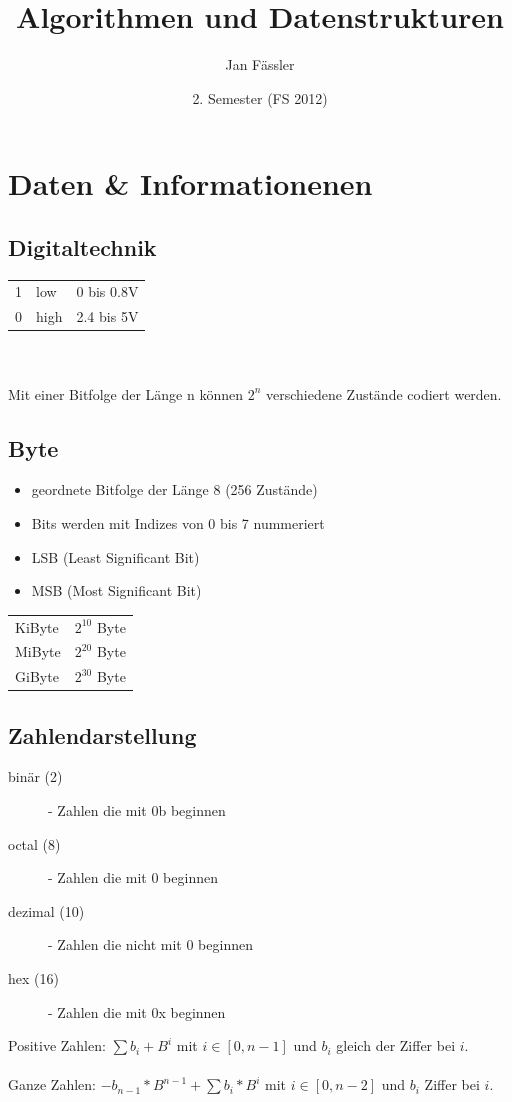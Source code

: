 \documentclass[a4paper,10pt]{article}
\title{Algorithmen und Datenstrukturen}
\author{Jan F\"assler}
\date{2. Semester (FS 2012)}
\begin{document}
\maketitle
\newpage
\thispagestyle{fancy} %

\section{Daten \& Informationenen}

\subsection{Digitaltechnik}
\begin{tabular}{l l l}
	1 & low & 0 bis 0.8V \\
	0 & high & 2.4 bis 5V
\end{tabular} \\ \\
Mit einer Bitfolge der L\"ange n k\"onnen $2^n$ verschiedene Zust\"ande codiert werden.

\subsection{Byte}
\begin{itemize}
	\item geordnete Bitfolge der L\"ange 8 (256 Zust\"ande)
	\item Bits werden mit Indizes von 0 bis 7 nummeriert
	\item LSB (Least Significant Bit)
	\item MSB (Most Significant Bit)
\end{itemize}
\begin{tabular}{l l}
	KiByte & $2^{10}$ Byte \\
	MiByte & $2^{20}$ Byte \\
	GiByte & $2^{30}$ Byte \\
\end{tabular}

\subsection{Zahlendarstellung}
\begin{description}
	\item[bin\"ar (2)] - Zahlen die mit 0b beginnen
	\item[octal (8)] - Zahlen die mit 0 beginnen
	\item[dezimal (10)] - Zahlen die nicht mit 0 beginnen
	\item[hex (16)] - Zahlen die mit 0x beginnen
\end{description}
Positive Zahlen: $\sum b_i+B^i$ mit $i \in [0,n-1]$ und $b_i$ gleich der Ziffer bei $i$. \\ \\
Ganze Zahlen: $-b_{n-1}*B^{n-1}+\sum b_i*B^i$ mit $i \in [0,n-2]$ und  $b_i$ Ziffer bei $i$.
\end{document}
